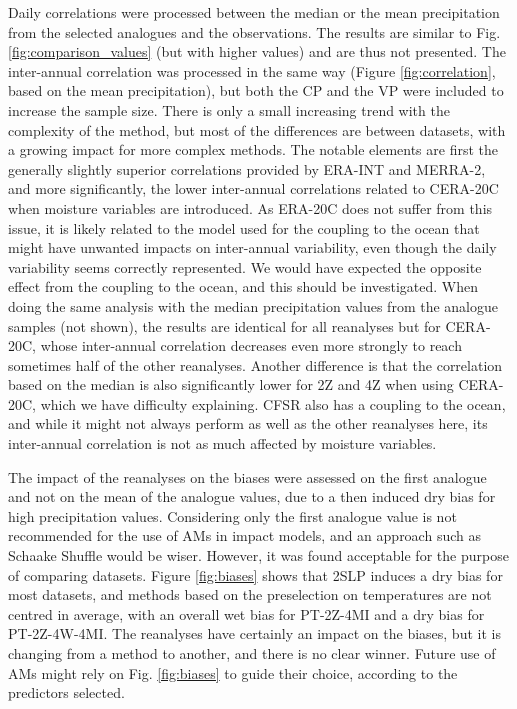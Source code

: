 \documentclass{ametsoc}
\begin{document}
Daily correlations were processed between the median or the mean precipitation from the selected analogues and the observations. The results are similar to Fig. \ref{fig:comparison_values} (but with higher values) and are thus not presented. The inter-annual correlation was processed in the same way (Figure \ref{fig:correlation}, based on the mean precipitation), but both the CP and the VP were included to increase the sample size. There is only a small increasing trend with the complexity of the method, but most of the differences are between datasets, with a growing impact for more complex methods. The notable elements are first the generally slightly superior correlations provided by ERA-INT and MERRA-2, and more significantly, the lower inter-annual correlations related to CERA-20C when moisture variables are introduced. As ERA-20C does not suffer from this issue, it is likely related to the model used for the coupling to the ocean that might have unwanted impacts on inter-annual variability, even though the daily variability seems correctly represented. We would have expected the opposite effect from the coupling to the ocean, and this should be investigated. When doing the same analysis with the median precipitation values from the analogue samples (not shown), the results are identical for all reanalyses but for CERA-20C, whose inter-annual correlation decreases even more strongly to reach sometimes half of the other reanalyses. Another difference is that the correlation based on the median is also significantly lower for 2Z and 4Z when using CERA-20C, which we have difficulty explaining. CFSR also has a coupling to the ocean, and while it might not always perform as well as the other reanalyses here, its inter-annual correlation is not as much affected by moisture variables.

The impact of the reanalyses on the biases were assessed on the first analogue and not on the mean of the analogue values, due to a then induced dry bias for high precipitation values. Considering only the first analogue value is not recommended for the use of AMs in impact models, and an approach such as Schaake Shuffle \citep{Clark2004a} would be wiser. However, it was found acceptable for the purpose of comparing datasets. Figure \ref{fig:biases} shows that 2SLP induces a dry bias for most datasets, and methods based on the preselection on temperatures are not centred in average, with an overall wet bias for PT-2Z-4MI and a dry bias for PT-2Z-4W-4MI. The reanalyses have certainly an impact on the biases, but it is changing from a method to another, and there is no clear winner. Future use of AMs might rely on Fig. \ref{fig:biases} to guide their choice, according to the predictors selected.
\end{document}
